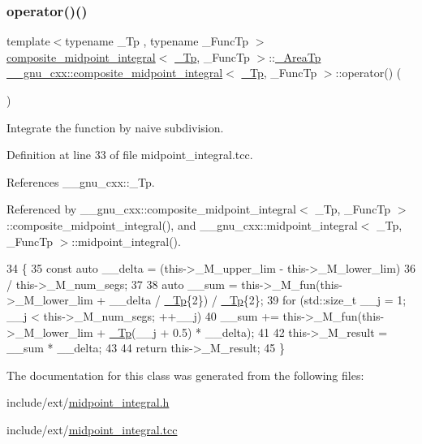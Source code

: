 \subsubsection{\texorpdfstring{operator()()}{operator()()}}
{\footnotesize\ttfamily template$<$typename \+\_\+\+Tp , typename \+\_\+\+Func\+Tp $>$ \\
\hyperlink{class____gnu__cxx_1_1composite__midpoint__integral}{composite\+\_\+midpoint\+\_\+integral}$<$ \hyperlink{namespace____gnu__cxx_a3b19a9c800ca194374ef9172290f7d79}{\+\_\+\+Tp}, \+\_\+\+Func\+Tp $>$\+::\hyperlink{class____gnu__cxx_1_1composite__midpoint__integral_a02175286c06db2fab6f727eab5117b25}{\+\_\+\+Area\+Tp} \hyperlink{class____gnu__cxx_1_1composite__midpoint__integral}{\+\_\+\+\_\+gnu\+\_\+cxx\+::composite\+\_\+midpoint\+\_\+integral}$<$ \hyperlink{namespace____gnu__cxx_a3b19a9c800ca194374ef9172290f7d79}{\+\_\+\+Tp}, \+\_\+\+Func\+Tp $>$\+::operator() (\begin{DoxyParamCaption}{ }\end{DoxyParamCaption})}

Integrate the function by naive subdivision. 

Definition at line 33 of file midpoint\+\_\+integral.\+tcc.



References \+\_\+\+\_\+gnu\+\_\+cxx\+::\+\_\+\+Tp.



Referenced by \+\_\+\+\_\+gnu\+\_\+cxx\+::composite\+\_\+midpoint\+\_\+integral$<$ \+\_\+\+Tp, \+\_\+\+Func\+Tp $>$\+::composite\+\_\+midpoint\+\_\+integral(), and \+\_\+\+\_\+gnu\+\_\+cxx\+::midpoint\+\_\+integral$<$ \+\_\+\+Tp, \+\_\+\+Func\+Tp $>$\+::midpoint\+\_\+integral().


\begin{DoxyCode}
34     \{
35       \textcolor{keyword}{const} \textcolor{keyword}{auto} \_\_delta = (this->\_M\_upper\_lim - this->\_M\_lower\_lim)
36                            / this->\_M\_num\_segs;
37 
38       \textcolor{keyword}{auto} \_\_sum = this->\_M\_fun(this->\_M\_lower\_lim + \_\_delta / \hyperlink{namespace____gnu__cxx_a3b19a9c800ca194374ef9172290f7d79}{\_Tp}\{2\}) / \hyperlink{namespace____gnu__cxx_a3b19a9c800ca194374ef9172290f7d79}{\_Tp}\{2\};
39       \textcolor{keywordflow}{for} (std::size\_t \_\_j = 1; \_\_j < this->\_M\_num\_segs; ++\_\_j)
40         \_\_sum += this->\_M\_fun(this->\_M\_lower\_lim + \hyperlink{namespace____gnu__cxx_a3b19a9c800ca194374ef9172290f7d79}{\_Tp}(\_\_j + 0.5) * \_\_delta);
41 
42       this->\_M\_result = \_\_sum * \_\_delta;
43 
44       \textcolor{keywordflow}{return} this->\_M\_result;
45     \}
\end{DoxyCode}


The documentation for this class was generated from the following files\+:\begin{DoxyCompactItemize}
\item 
include/ext/\hyperlink{midpoint__integral_8h}{midpoint\+\_\+integral.\+h}\item 
include/ext/\hyperlink{midpoint__integral_8tcc}{midpoint\+\_\+integral.\+tcc}\end{DoxyCompactItemize}

